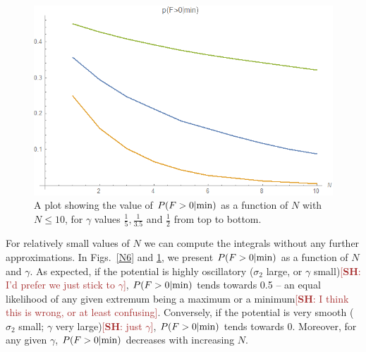 \documentclass[12pt]{article}
\newcommand{\SH}[1]{\textcolor{brown}{[{\bf SH}: #1]}}
\begin{document}
\begin{figure}
  \centering
    \includegraphics[width=\linewidth]{PVaryingWithN.png}
  \caption{A plot showing the value of $P(F>0|{\rm min})$ as a function of $N$ with $N\le10$, for $\gamma$ values $\frac{1}{5}, \frac{1}{3.5}$ and $\frac{1}{2}$ from top to bottom.}
  \label{gamma}
\end{figure}

For relatively small values of $N$ we can compute the integrals without any further approximations.   In Figs.~\ref{N6} and \ref{gamma}, we present $P(F>0|{\rm min})$ as a function of $N$ and $\gamma$. As expected, if the potential is highly oscillatory ($\sigma_2$ large, or $\gamma$ small)\SH{I'd prefer we just stick to $\gamma$}, $P(F>0|{\rm min})$  tends towards 0.5 --  an equal likelihood of any given extremum being a maximum or a minimum\SH{I think this is wrong, or at least confusing}. Conversely, if the potential is very smooth ($\sigma_2$ small; $\gamma$ very large)\SH{just $\gamma$}, $P(F>0|{\rm min})$  tends towards 0. Moreover, for any given $\gamma$, $P(F>0|{\rm min})$ decreases with increasing $N$. 
 
\end{document}
